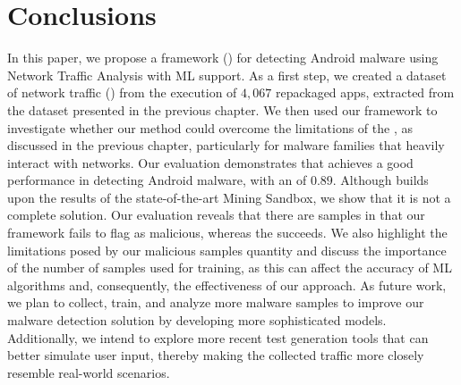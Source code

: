 \section{Conclusions}\label{sec:conclusions}



In this paper, we propose a framework (\droidxpflow) for detecting Android malware using Network Traffic Analysis with ML support. As a first step, we created a dataset of network traffic (\fds) from the execution of $4,067$ repackaged apps, extracted from the dataset presented in the previous chapter. We then used our framework to investigate whether our method could overcome the limitations of the \mas, as discussed in the previous chapter, particularly for malware families that heavily interact with networks. Our evaluation demonstrates that \droidxpflow achieves a good performance in detecting Android malware, with an \fone of $0.89$. Although \droidxpflow builds upon the results of the state-of-the-art Mining Sandbox, we show that it is not a complete solution. Our evaluation reveals that there are samples in \fds that our framework fails to flag as malicious, whereas the \mas succeeds. We also highlight the limitations posed by our malicious samples quantity and discuss the importance of the number of samples used for training, as this can affect the accuracy of ML algorithms and, consequently, the effectiveness of our approach. As future work, we plan to collect, train, and analyze more malware samples to improve our malware detection solution by developing more sophisticated models. Additionally, we intend to explore more recent test generation tools that can better simulate user input, thereby making the collected traffic more closely resemble real-world scenarios.
